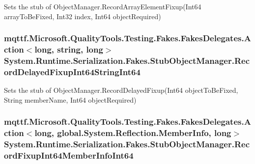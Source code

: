 Sets the stub of Object\-Manager.\-Record\-Array\-Element\-Fixup(\-Int64 array\-To\-Be\-Fixed, Int32 index, Int64 object\-Required)

\hypertarget{class_system_1_1_runtime_1_1_serialization_1_1_fakes_1_1_stub_object_manager_a209e819fe7930498102b666867b14c06}{
\subsubsection[{Record\-Delayed\-Fixup\-Int64\-String\-Int64}]{\setlength{\rightskip}{0pt plus 5cm}mqttf.\-Microsoft.\-Quality\-Tools.\-Testing.\-Fakes.\-Fakes\-Delegates.\-Action$<$long, string, long$>$ System.\-Runtime.\-Serialization.\-Fakes.\-Stub\-Object\-Manager.\-Record\-Delayed\-Fixup\-Int64\-String\-Int64}}\label{class_system_1_1_runtime_1_1_serialization_1_1_fakes_1_1_stub_object_manager_a209e819fe7930498102b666867b14c06}


Sets the stub of Object\-Manager.\-Record\-Delayed\-Fixup(\-Int64 object\-To\-Be\-Fixed, String member\-Name, Int64 object\-Required)

\hypertarget{class_system_1_1_runtime_1_1_serialization_1_1_fakes_1_1_stub_object_manager_afa498aaebf66a72de63558dda448da86}{
\subsubsection[{Record\-Fixup\-Int64\-Member\-Info\-Int64}]{\setlength{\rightskip}{0pt plus 5cm}mqttf.\-Microsoft.\-Quality\-Tools.\-Testing.\-Fakes.\-Fakes\-Delegates.\-Action$<$long, global.\-System.\-Reflection.\-Member\-Info, long$>$ System.\-Runtime.\-Serialization.\-Fakes.\-Stub\-Object\-Manager.\-Record\-Fixup\-Int64\-Member\-Info\-Int64}}\label{class_system_1_1_runtime_1_1_serialization_1_1_fakes_1_1_stub_object_manager_afa498aaebf66a72de63558dda448da86}



